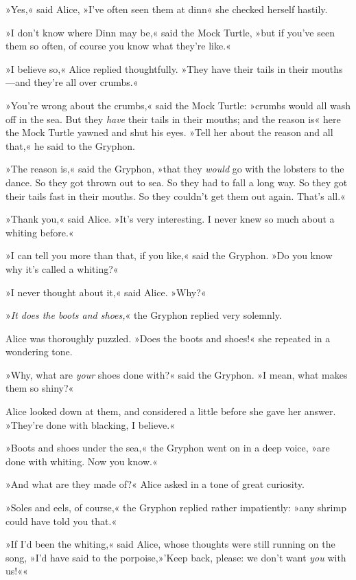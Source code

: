 »Yes,« said Alice, »I've often seen them at dinn\longdash« she checked herself hastily.

»I don't know where Dinn may be,« said the Mock Turtle, »but if you've seen them so often, of course you know what they're like.«

»I believe so,« Alice replied thoughtfully. »They have their tails in their mouths—and they're all over crumbs.«

»You're wrong about the crumbs,« said the Mock Turtle: »crumbs would all wash off in the sea. But they \textit{have} their tails in their mouths; and the reason is\longdash« here the Mock Turtle yawned and shut his eyes. »Tell her about the reason and all that,« he said to the Gryphon.

»The reason is,« said the Gryphon, »that they \textit{would} go with the lobsters to the dance. So they got thrown out to sea. So they had to fall a long way. So they got their tails fast in their mouths. So they couldn't get them out again. That's all.«

»Thank you,« said Alice. »It's very interesting. I never knew so much about a whiting before.«

»I can tell you more than that, if you like,« said the Gryphon. »Do you know why it's called a whiting?«

»I never thought about it,« said Alice. »Why?«

»\textit{It does the boots and shoes,}« the Gryphon replied very solemnly.

Alice was thoroughly puzzled. »Does the boots and shoes!« she repeated in a wondering tone.

»Why, what are \textit{your} shoes done with?« said the Gryphon. »I mean, what makes them so shiny?«

Alice looked down at them, and considered a little before she gave her answer. »They're done with blacking, I believe.«

»Boots and shoes under the sea,« the Gryphon went on in a deep voice, »are done with whiting. Now you know.«

»And what are they made of?« Alice asked in a tone of great curiosity.

»Soles and eels, of course,« the Gryphon replied rather impatiently: »any shrimp could have told you that.«

»If I'd been the whiting,« said Alice, whose thoughts were still running on the song, »I'd have said to the porpoise,»'Keep back, please: we don't want \textit{you} with us!««

